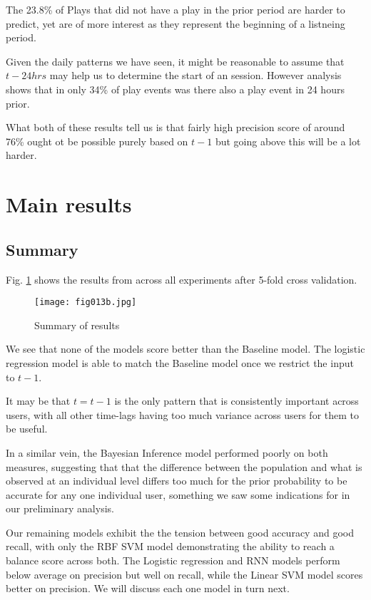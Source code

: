 The 23.8\% of Plays that did not have a play in the prior period are harder to predict, yet are of more interest as they represent the beginning of a listneing period. 

Given the daily patterns we have seen, it might be reasonable to assume that $t-24hrs$ may help us to determine the start of an session. However analysis shows that in only 34\% of play events was there also a play event in 24 hours prior.

What both of these results tell us is that fairly high precision score of around 76\% ought ot be possible purely based on $t-1$ but going above this will be a lot harder.

\section{Main results} %

\subsection{Summary}

Fig. \ref{fig13b} shows the results from across all experiments after 5-fold cross validation.

\begin{figure}[h!]
	\centering
	\texttt{[image: fig013b.jpg]}
	\caption{Summary of results}
	\label{fig13b}
\end{figure}  

We see that none of the models score better than the Baseline model. The logistic regression model is able to match the Baseline model once we restrict the input to $t-1$. 

It may be that $t = t-1$ is the only pattern that is consistently important across users, with all other time-lags having too much variance across users for them to be useful.

In a similar vein, the Bayesian Inference model performed poorly on both measures, suggesting that that the difference between the population and what is observed at an individual level differs too much for the prior probability to be accurate for any one individual user, something we saw some indications for in our preliminary analysis. 

Our remaining models exhibit the the tension between good accuracy and good recall, with only the RBF SVM model demonstrating the ability to reach a balance score across both. The Logistic regression and RNN models perform below average on precision but well on recall, while the Linear SVM model scores better on precision. We will discuss each one model in turn next.
 
